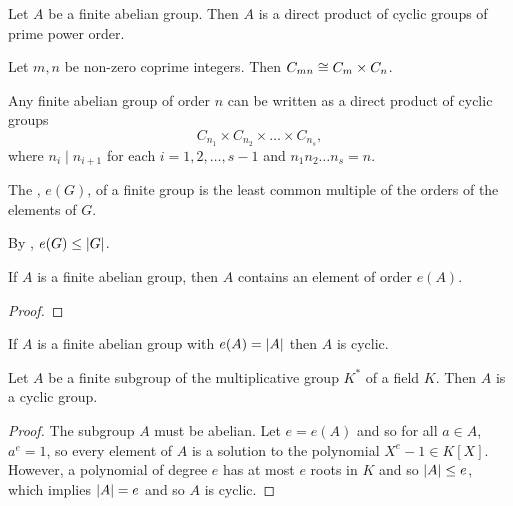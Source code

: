 \begin{theorem}\label{thm:group-theory:fundamental-theorem-of-finite-abelian-groups-I}
  Let \(A\) be a finite abelian group. Then \(A\) is a direct product of cyclic groups of prime power order.
\end{theorem}

\begin{theorem}
  Let \(m, n\) be non-zero coprime integers. Then \(C_{mn} \cong C_{m} \times C_{n}\).
\end{theorem}

\begin{corollary} \label{cor:group-theory:fundamental-theorem-of-finite-abelian-groups-II}
  Any finite abelian group of order \(n\) can be written as a direct product of cyclic groups
  \[C_{n_{1}} \times C_{{n_{2}}} \times \ldots \times C_{n_{s}},\]
  where \(n_{i} \mid n_{i+1}\) for each \(i = 1, 2, \ldots, s-1\) and \(n_{1}n_{2}\ldots n_{s} = n\).
\end{corollary}

\begin{definition}
  The , \(e(G)\), of a finite group is the least common multiple of the orders of the elements of \(G\).
\end{definition}

By , \(e(G) \leq \abs{G}\).

\begin{lemma}
  If \(A\) is a finite abelian group, then \(A\) contains an element of order \(e(A)\).
\end{lemma}

\begin{proof}
\end{proof}

\begin{corollary}
  If \(A\) is a finite abelian group with \(e(A) = \abs{A}\) then \(A\) is cyclic.
\end{corollary}

\begin{theorem}
  Let \(A\) be a finite subgroup of the multiplicative group \(K^{*}\) of a field \(K\). Then \(A\) is a cyclic group.
\end{theorem}

\begin{proof}
  The subgroup \(A\) must be abelian. Let \(e = e(A)\) and so for all \(a \in A\), \(a^{e} = 1\), so every element of \(A\) is a solution to the polynomial \(X^{e} - 1 \in K[X]\). However, a polynomial of degree \(e\) has at most \(e\) roots in \(K\) and so \(\abs{A} \leq e\), which implies \(\abs{A} = e\) and so \(A\) is cyclic.
\end{proof}

